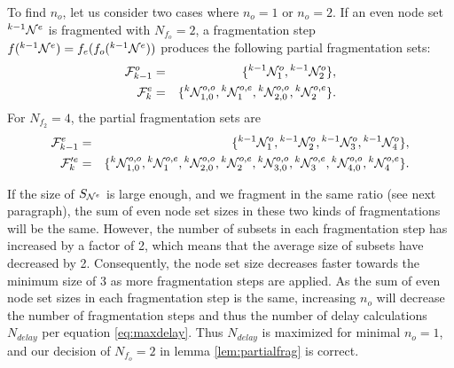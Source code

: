 To find $n_o$, let us consider two cases where $n_o = 1$ or $n_o=2$. If an even node set ${}^{k-1}\mathcal{N}^e$ is fragmented with $N_{f_o}=2$, a fragmentation step $f({}^{k-1}\mathcal{N}^e)=f_e(f_o({}^{k-1}\mathcal{N}^e))$ produces the following partial fragmentation sets:
\begin{eqnarray*}
  \mathcal{F}^o_{k-1} &=& \{ {}^{k-1} \mathcal{N}^{o}_1, {}^{k-1} \mathcal{N}^{o}_2\},  \\
  \mathcal{F}^e_{k} &=& \{{}^{k}\mathcal{N}^{o,o}_{1,0}, {}^{k}\mathcal{N}^{o,e}_1, {}^{k}\mathcal{N}^{o,o}_{2,0}, {}^{k}\mathcal{N}^{o,e}_2 \}.
\end{eqnarray*}
For $N_{f_2} = 4$, the partial fragmentation sets are
\begin{eqnarray*}
  \mathcal{F}^e_{k-1} &=& \{ {}^{k-1}\mathcal{N}^{o}_1, {}^{k-1}\mathcal{N}^{o}_2,  {}^{k-1}\mathcal{N}^{o}_3, {}^{k-1}\mathcal{N}^{o}_4\},  \\
  \mathcal{F}'^e_{k} &=& \{{}^{k}\mathcal{N}^{o,o}_{1,0}, {}^{k}\mathcal{N}^{o,e}_1,  {}^{k}\mathcal{N}^{o,o}_{2,0}, {}^{k}\mathcal{N}^{o,e}_2,  {}^{k}\mathcal{N}^{o,o}_{3,0}, {}^{k}\mathcal{N}^{o,e}_3, {}^{k}\mathcal{N}^{o,o}_{4,0}, {}^{k}\mathcal{N}^{o,e}_4 \}.
\end{eqnarray*}

If the size of $S_{\mathcal{N}^e}$ is large enough, and we fragment in the same ratio (see next paragraph), the sum of even node set sizes in these two kinds of fragmentations will be the same. However, the number of subsets in each fragmentation step has increased by a factor of 2, which means that the average size of subsets have decreased by 2. Consequently, the node set size decreases faster towards the minimum size of 3 as more fragmentation steps are applied. As the sum of even node set sizes in each fragmentation step is the same, increasing $n_o$ will decrease the number of fragmentation steps and thus the number of delay calculations $N_{delay}$ per equation \ref{eq:maxdelay}. Thus $N_{delay}$ is maximized for minimal $n_o = 1$, and our decision of $N_{f_o}=2$ in lemma \ref{lem:partialfrag} is correct.


